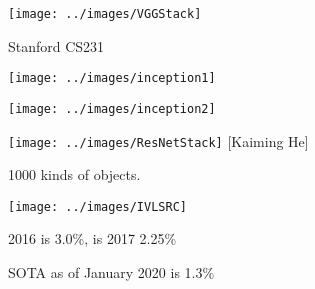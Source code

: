 {
\centerline{\texttt{[image: ../images/VGGStack]}}
\centerline{\large Stanford CS231}


\centerline{\texttt{[image: ../images/inception1]}}
\vfill
\centerline{\texttt{[image: ../images/inception2]}}

\centerline{\texttt{[image: ../images/ResNetStack]} {\large [Kaiming He]}}



1000 kinds of objects.

\vfill
\centerline{\texttt{[image: ../images/IVLSRC]}}
2016 is 3.0\%, is 2017 2.25\%

\medskip
SOTA as of January 2020 is 1.3\%

}

